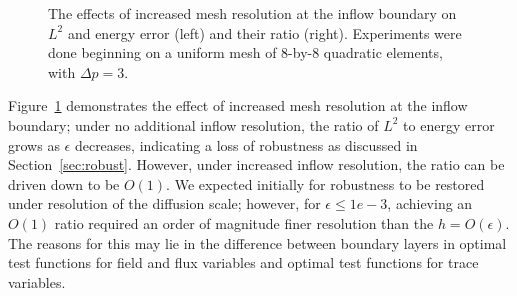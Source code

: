 \begin{figure}[!h]
\centering
{}
\caption{The effects of increased mesh resolution at the inflow boundary on $L^2$ and energy error (left) and their ratio (right).  Experiments were done beginning on a uniform mesh of 8-by-8 quadratic elements, with $\Delta p = 3$.}
\label{fig:robustness}
\end{figure}

Figure~\ref{fig:robustness} demonstrates the effect of increased mesh resolution at the inflow boundary; under no additional inflow resolution, the ratio of $L^2$ to energy error grows as $\epsilon$ decreases, indicating a loss of robustness as discussed in Section~\ref{sec:robust}.  However, under increased inflow resolution, the ratio can be driven down to be $O(1)$.  We expected initially for robustness to be restored under resolution of the diffusion scale; however, for $\epsilon \leq 1e-3$, achieving an $O(1)$ ratio required an order of magnitude finer resolution than the $h = O(\epsilon)$.  The reasons for this may lie in the difference between boundary layers in optimal test functions for field and flux variables and optimal test functions for trace variables.

